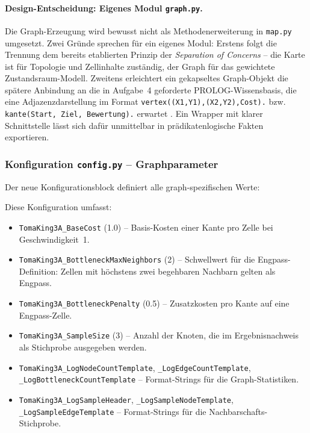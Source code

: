 \paragraph{Design-Entscheidung: Eigenes Modul \texttt{graph.py}.}
Die Graph-Erzeugung wird bewusst nicht als Methodenerweiterung in \texttt{map.py} umgesetzt. Zwei Gründe sprechen für ein eigenes Modul: Erstens folgt die Trennung dem bereits etablierten Prinzip der \textit{Separation of Concerns} -- die Karte ist für Topologie und Zellinhalte zuständig, der Graph für das gewichtete Zustandsraum-Modell. Zweitens erleichtert ein gekapseltes Graph-Objekt die spätere Anbindung an die in Aufgabe~4 geforderte \acs{PROLOG}-Wissensbasis, die eine Adjazenzdarstellung im Format \texttt{vertex((X1,Y1),(X2,Y2),Cost).} bzw. \texttt{kante(Start, Ziel, Bewertung).} erwartet \cite[S. 69\,f.]{4}. Ein Wrapper mit klarer Schnittstelle lässt sich dafür unmittelbar in prädikatenlogische Fakten exportieren.


\subsubsection{Konfiguration \texttt{config.py} – Graphparameter}

Der neue Konfigurationsblock definiert alle graph-spezifischen Werte:



Diese Konfiguration umfasst:
\begin{itemize}
    \item \texttt{TomaKing3A\_BaseCost} (1.0) -- Basis-Kosten einer Kante pro Zelle bei Geschwindigkeit~1.
    \item \texttt{TomaKing3A\_BottleneckMaxNeighbors} (2) -- Schwellwert für die Engpass-Definition: Zellen mit höchstens zwei begehbaren Nachbarn gelten als Engpass.
    \item \texttt{TomaKing3A\_BottleneckPenalty} (0.5) -- Zusatzkosten pro Kante auf eine Engpass-Zelle.
    \item \texttt{TomaKing3A\_SampleSize} (3) -- Anzahl der Knoten, die im Ergebnisnachweis als Stichprobe ausgegeben werden.
    \item \texttt{TomaKing3A\_LogNodeCountTemplate}, \texttt{\_LogEdgeCountTemplate}, \\ \texttt{\_LogBottleneckCountTemplate} -- Format-Strings für die Graph-Statistiken.
    \item \texttt{TomaKing3A\_LogSampleHeader}, \texttt{\_LogSampleNodeTemplate}, \texttt{\_LogSampleEdgeTemplate} -- Format-Strings für die Nachbarschafts-Stichprobe.
\end{itemize}

